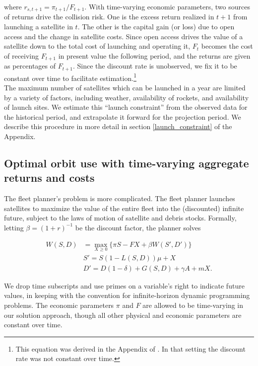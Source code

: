 \documentclass[12pt]{article}
\begin{document}
where $r_{s,t+1} = \pi_{t+1}/F_{t+1}$. With time-varying economic parameters, two sources of returns drive the collision risk. One is the excess return realized in $t+1$ from launching a satellite in $t$. The other is the capital gain (or loss) due to open access and the change in satellite costs. Since open access drives the value of a satellite down to the total cost of launching and operating it, $F_t$ becomes the cost of receiving $F_{t+1}$ in present value the following period, and the returns are given as percentages of $F_{t+1}$. Since the discount rate is unobserved, we fix it to be constant over time to facilitate estimation.\footnote{This equation was derived in the Appendix of \cite{raorondinaWP}. In that setting the discount rate was not constant over time.} \\

The maximum number of satellites which can be launched in a year are limited by a variety of factors, including weather, availability of rockets, and availability of launch sites. We estimate this ``launch constraint'' from the observed data for the historical period, and extrapolate it forward for the projection period. We describe this procedure in more detail in section \ref{launch_constraint} of the Appendix.

\subsection{Optimal orbit use with time-varying aggregate returns and costs}

The fleet planner's problem is more complicated. The fleet planner launches satellites to maximize the value of the entire fleet into the (discounted) infinite future, subject to the laws of motion of satellite and debris stocks. Formally, letting $\beta = (1+r)^{-1}$ be the discount factor, the planner solves

\begin{align}
\label{plannersProblem}
W(S,D) &= \max_{X \geq 0} \{ \pi S - F X + \beta W(S',D') \} \\
& S' = S(1 - L(S,D))\mu + X \nonumber \\
& D' = D(1-\delta) + G(S,D) + \gamma A + m X \nonumber .
\end{align}

We drop time subscripts and use primes on a variable's right to indicate future values, in keeping with the convention for infinite-horizon dynamic programming problems. The economic parameters $\pi$ and $F$ are allowed to be time-varying in our solution approach, though all other physical and economic parameters are constant over time. \\
\end{document}
